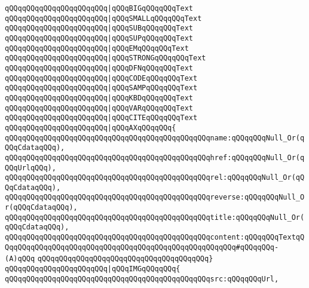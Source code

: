 \verb|qQQqqQQqqQQqqQQqqQQqqQQq|\verb#|qQQqBIGqQQqqQQqText#\newline
\verb|qQQqqQQqqQQqqQQqqQQqqQQq|\verb#|qQQqSMALLqQQqqQQqText#\newline
\verb|qQQqqQQqqQQqqQQqqQQqqQQq|\verb#|qQQqSUBqQQqqQQqText#\newline
\verb|qQQqqQQqqQQqqQQqqQQqqQQq|\verb#|qQQqSUPqQQqqQQqText#\newline
\verb|qQQqqQQqqQQqqQQqqQQqqQQq|\verb#|qQQqEMqQQqqQQqText#\newline
\verb|qQQqqQQqqQQqqQQqqQQqqQQq|\verb#|qQQqSTRONGqQQqqQQqText#\newline
\verb|qQQqqQQqqQQqqQQqqQQqqQQq|\verb#|qQQqDFNqQQqqQQqText#\newline
\verb|qQQqqQQqqQQqqQQqqQQqqQQq|\verb#|qQQqCODEqQQqqQQqText#\newline
\verb|qQQqqQQqqQQqqQQqqQQqqQQq|\verb#|qQQqSAMPqQQqqQQqText#\newline
\verb|qQQqqQQqqQQqqQQqqQQqqQQq|\verb#|qQQqKBDqQQqqQQqText#\newline
\verb|qQQqqQQqqQQqqQQqqQQqqQQq|\verb#|qQQqVARqQQqqQQqText#\newline
\verb|qQQqqQQqqQQqqQQqqQQqqQQq|\verb#|qQQqCITEqQQqqQQqText#\newline
\verb|qQQqqQQqqQQqqQQqqQQqqQQq|\verb#|qQQqAXqQQqqQQq{#\newline
\verb|qQQqqQQqqQQqqQQqqQQqqQQqqQQqqQQqqQQqqQQqqQQqqQQqname:qQQqqQQqNull_Or(qQQqCdataqQQq),|\newline
\verb|qQQqqQQqqQQqqQQqqQQqqQQqqQQqqQQqqQQqqQQqqQQqqQQqhref:qQQqqQQqNull_Or(qQQqUrlqQQq),|\newline
\verb|qQQqqQQqqQQqqQQqqQQqqQQqqQQqqQQqqQQqqQQqqQQqqQQqrel:qQQqqQQqNull_Or(qQQqCdataqQQq),|\newline
\verb|qQQqqQQqqQQqqQQqqQQqqQQqqQQqqQQqqQQqqQQqqQQqqQQqreverse:qQQqqQQqNull_Or(qQQqCdataqQQq),|\newline
\verb|qQQqqQQqqQQqqQQqqQQqqQQqqQQqqQQqqQQqqQQqqQQqqQQqtitle:qQQqqQQqNull_Or(qQQqCdataqQQq),|\newline
\verb|qQQqqQQqqQQqqQQqqQQqqQQqqQQqqQQqqQQqqQQqqQQqqQQqcontent:qQQqqQQqTextqQQqqQQqqQQqqQQqqQQqqQQqqQQqqQQqqQQqqQQqqQQqqQQqqQQqqQQq#qQQqqQQq-(A)qQQq|\newline
\verb|qQQqqQQqqQQqqQQqqQQqqQQqqQQqqQQqqQQqqQQq}|\newline
\verb|qQQqqQQqqQQqqQQqqQQqqQQq|\verb#|qQQqIMGqQQqqQQq{#\newline
\verb|qQQqqQQqqQQqqQQqqQQqqQQqqQQqqQQqqQQqqQQqqQQqqQQqsrc:qQQqqQQqUrl,|\newline
